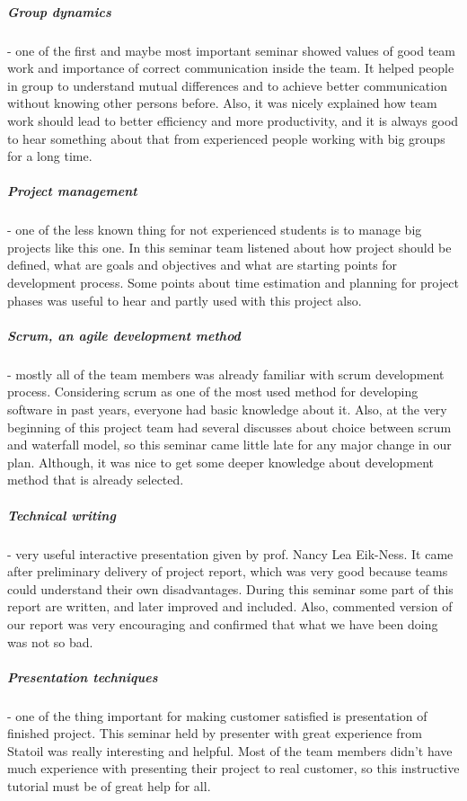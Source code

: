 	\subparagraph{Group dynamics} - one of the first and maybe most important seminar showed values of good team work and importance of correct communication inside the team. It helped people in group to understand mutual differences and to achieve better communication without knowing other persons before. Also, it was nicely explained how team work should lead to better efficiency and more productivity, and it is always good to hear something about that from experienced people working with big groups for a long time.
	\subparagraph{Project management} - one of the less known thing for not experienced students is to manage big projects like this one. In this seminar team listened about how project should be defined, what are goals and objectives and what are starting points for development process. Some points about time estimation and planning for project phases was useful to hear and partly used with this project also.
	\subparagraph{Scrum, an agile development method} - mostly all of the team members was already familiar with scrum development process. Considering scrum as one of the most used method for developing software in past years, everyone had basic knowledge about it. Also, at the very beginning of this project team had several discusses about choice between scrum and waterfall model, so this seminar came little late for any major change in our plan. Although, it was nice to get some deeper knowledge about development method that is already selected.
	\subparagraph{Technical writing} - very useful interactive presentation given by prof. Nancy Lea Eik-Ness. It came after preliminary delivery of project report, which was very good because teams could understand their own disadvantages. During this seminar some part of this report are written, and later improved and included. Also, commented version of our report was very encouraging and confirmed that what we have been doing was not so bad.
	\subparagraph{Presentation techniques} - one of the thing important for making customer satisfied is presentation of finished project. This seminar held by presenter with great experience from Statoil was really interesting and helpful. Most of the team members didn't have much experience with presenting their project to real customer, so this instructive tutorial must be of great help for all.


